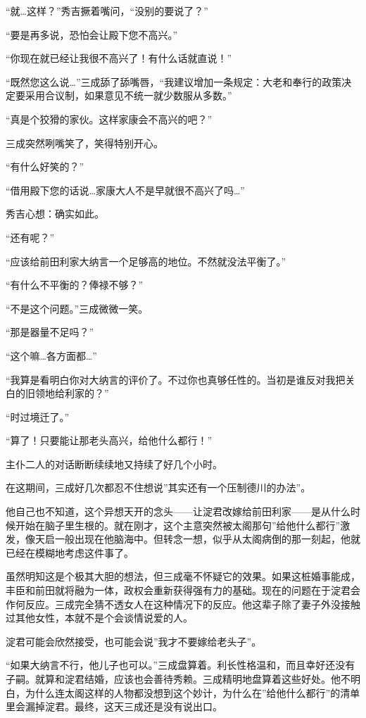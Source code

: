 \documentclass[
]{book}
\begin{document}
``就\ldots 这样？''秀吉撅着嘴问，``没别的要说了？''

``要是再多说，恐怕会让殿下您不高兴。''

``你现在就已经让我很不高兴了！有什么话就直说！''

``既然您这么说\ldots{}''三成舔了舔嘴唇，``我建议增加一条规定：大老和奉行的政策决定要采用合议制，如果意见不统一就少数服从多数。''

``真是个狡猾的家伙。这样家康会不高兴的吧？''

三成突然咧嘴笑了，笑得特别开心。

``有什么好笑的？''

``借用殿下您的话说\ldots 家康大人不是早就很不高兴了吗\ldots{}''

秀吉心想：确实如此。

``还有呢？''

``应该给前田利家大纳言一个足够高的地位。不然就没法平衡了。''

``有什么不平衡的？俸禄不够？''

``不是这个问题。''三成微微一笑。

``那是器量不足吗？''

``这个嘛\ldots 各方面都\ldots{}''

``我算是看明白你对大纳言的评价了。不过你也真够任性的。当初是谁反对我把关白的旧领地给利家的？''

``时过境迁了。''

``算了！只要能让那老头高兴，给他什么都行！''

主仆二人的对话断断续续地又持续了好几个小时。

在这期间，三成好几次都忍不住想说''其实还有一个压制德川的办法''。

他自己也不知道，这个异想天开的念头------让淀君改嫁给前田利家------是从什么时候开始在脑子里生根的。就在刚才，这个主意突然被太阁那句''给他什么都行''激发，像天启一般出现在他脑海中。但转念一想，似乎从太阁病倒的那一刻起，他就已经在模糊地考虑这件事了。

虽然明知这是个极其大胆的想法，但三成毫不怀疑它的效果。如果这桩婚事能成，丰臣和前田就将融为一体，政权会重新获得强有力的基础。现在的问题在于淀君会作何反应。三成完全猜不透女人在这种情况下的反应。他这辈子除了妻子外没接触过其他女性，本就不是个会谈情说爱的人。

淀君可能会欣然接受，也可能会说''我才不要嫁给老头子''。

``如果大纳言不行，他儿子也可以。''三成盘算着。利长性格温和，而且幸好还没有子嗣。就算和淀君结婚，应该也会善待秀赖。三成精明地盘算着这些好处。他不明白，为什么连太阁这样的人物都没想到这个妙计，为什么在''给他什么都行''的清单里会漏掉淀君。最终，这天三成还是没有说出口。
\end{document}
